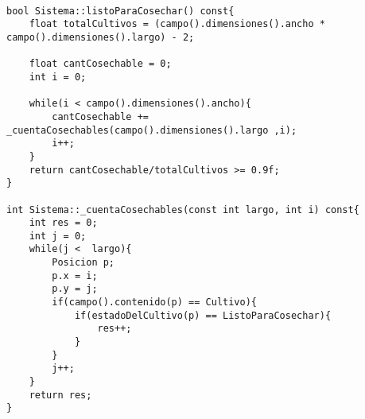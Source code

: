 \begin{lstlisting}

bool Sistema::listoParaCosechar() const{
    float totalCultivos = (campo().dimensiones().ancho * campo().dimensiones().largo) - 2;

    float cantCosechable = 0;
    int i = 0;

    while(i < campo().dimensiones().ancho){
        cantCosechable += _cuentaCosechables(campo().dimensiones().largo ,i);  
		i++;
    }
    return cantCosechable/totalCultivos >= 0.9f;
}

int Sistema::_cuentaCosechables(const int largo, int i) const{
    int res = 0;
    int j = 0;
    while(j <  largo){
        Posicion p;
        p.x = i;
        p.y = j;
        if(campo().contenido(p) == Cultivo){
            if(estadoDelCultivo(p) == ListoParaCosechar){
                res++;
            }
        }
        j++;
    }
    return res;
}

\end{lstlisting}